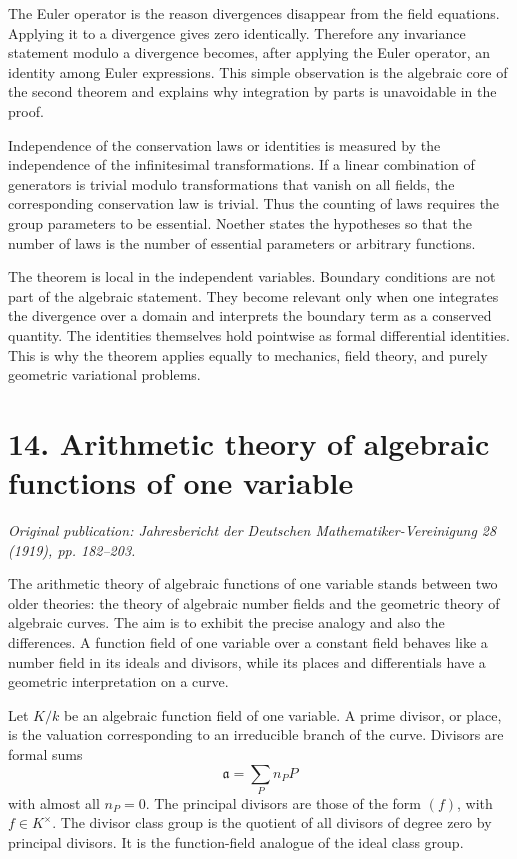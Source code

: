\documentclass[12pt]{article}
\begin{document}
The Euler operator is the reason divergences disappear from the field equations. Applying it to a
divergence gives zero identically. Therefore any invariance statement modulo a divergence becomes,
after applying the Euler operator, an identity among Euler expressions. This simple observation is
the algebraic core of the second theorem and explains why integration by parts is unavoidable in the
proof.

Independence of the conservation laws or identities is measured by the independence of the
infinitesimal transformations. If a linear combination of generators is trivial modulo
transformations that vanish on all fields, the corresponding conservation law is trivial. Thus the
counting of laws requires the group parameters to be essential. Noether states the hypotheses so
that the number of laws is the number of essential parameters or arbitrary functions.

The theorem is local in the independent variables. Boundary conditions are not part of the algebraic
statement. They become relevant only when one integrates the divergence over a domain and interprets
the boundary term as a conserved quantity. The identities themselves hold pointwise as formal
differential identities. This is why the theorem applies equally to mechanics, field theory, and
purely geometric variational problems.


\section{14. Arithmetic theory of algebraic functions of one variable}

\textit{Original publication: Jahresbericht der Deutschen Mathematiker-Vereinigung 28 (1919), pp. 182--203.}

The arithmetic theory of algebraic functions of one variable stands between two older theories: the
theory of algebraic number fields and the geometric theory of algebraic curves. The aim is to
exhibit the precise analogy and also the differences. A function field of one variable over a
constant field behaves like a number field in its ideals and divisors, while its places and
differentials have a geometric interpretation on a curve.


Let \(K/k\) be an algebraic function field of one variable. A prime divisor, or place, is the
valuation corresponding to an irreducible branch of the curve. Divisors are formal sums \[
\mathfrak a=\sum_P n_P P \] with almost all \(n_P=0\). The principal divisors are those of the form
\((f)\), with \(f\in K^\times\). The divisor class group is the quotient of all divisors of degree
zero by principal divisors. It is the function-field analogue of the ideal class group.
\end{document}
